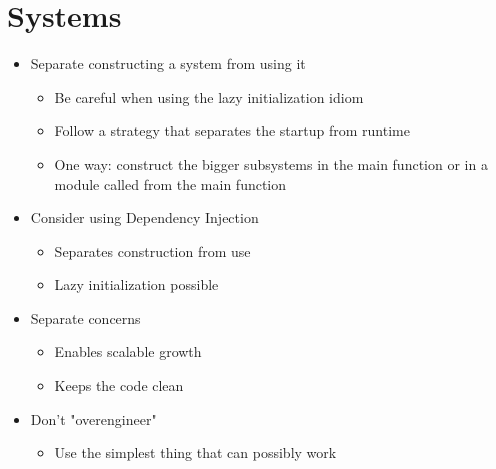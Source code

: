 
\section{Systems}
\begin{itemize}
    \item Separate constructing a system from using it
    \begin{itemize}
        \item Be careful when using the lazy initialization idiom
        \item Follow a strategy that separates the startup from runtime
        \item One way: construct the bigger subsystems in the main function or in a module called from the main function
    \end{itemize}
    \item Consider using Dependency Injection
    \begin{itemize}
        \item Separates construction from use
        \item Lazy initialization possible
    \end{itemize}
    \item Separate concerns
    \begin{itemize}
        \item Enables scalable growth
        \item Keeps the code clean
    \end{itemize}
    \item Don't "overengineer"
    \begin{itemize}
        \item Use the simplest thing that can possibly work
    \end{itemize}
\end{itemize}